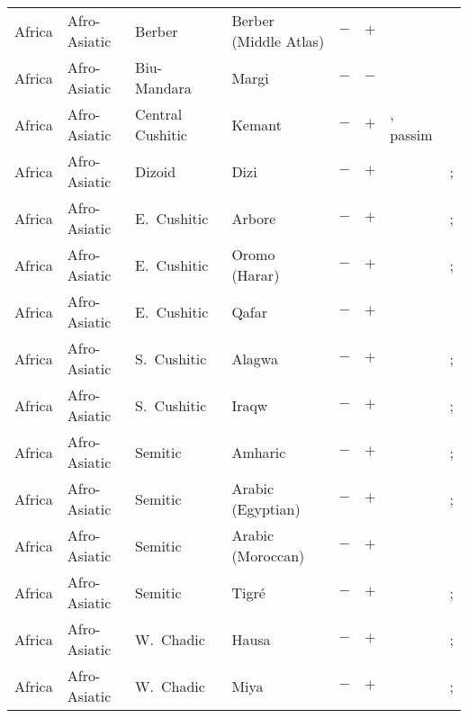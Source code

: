 \begin{landscape}
\begin{longtable}{l>{\raggedright\arraybackslash}p{2.2cm}>{\raggedright}p{2.5cm}>{\raggedright\arraybackslash}p{2.5cm}cc>{\raggedright\arraybackslash}p{3.4cm}>{\raggedright\arraybackslash}p{3.4cm}}
Africa & Afro-Asiatic & Berber & Berber (Middle Atlas) & $-$ & $+$ & \citealt[24--25]{Penchoen1973} & \citealt[12--13, 21--22, 25--27, 39--40, 54--55]{Penchoen1973}\\
Africa & Afro-Asiatic & Biu-Mandara & Margi & $-$ & $-$ & \citealt{Gil2013} & \citealt[46, 72--75, 85--87]{Hoffman1963}\\
Africa & Afro-Asiatic & Central Cushitic & Kemant & $-$ & $+$ & \citealt[329]{Appleyard1975}, passim & \citealt[319--322, 332--333]{Appleyard1975}\\
Africa & Afro-Asiatic & Dizoid & Dizi & $-$ & $+$ & \citealt{Gil2013} & \citealt{Corbett2013}; \citealt[295]{Nichols1992}\\
Africa & Afro-Asiatic & E.~Cushitic & Arbore & $-$ & $+$ & \citealt{Gil2013} & \citealt{Corbett2013}; \citealt[131--132]{Hayward1984}\\
Africa & Afro-Asiatic & E.~Cushitic & Oromo (Harar) & $-$ & $+$ & \citealt{Gil2013} & \citealt{Corbett2013}; \citealt[65]{Owens1985}\\
Africa & Afro-Asiatic & E.~Cushitic & Qafar & $-$ & $+$ & \citealt[185--186]{Bliese1981} & \citealt[180--182, 186--188]{Bliese1981}\\
Africa & Afro-Asiatic & S.~Cushitic & Alagwa & $-$ & $+$ & \citealt{Gil2013} & \citealt{Corbett2013}; \citealt[147--149]{Mous2008}\\
Africa & Afro-Asiatic & S.~Cushitic & Iraqw & $-$ & $+$ & \citealt{Gil2013} & \citealt{Corbett2013}; \citealt[41]{Mous1992}\\
Africa & Afro-Asiatic & Semitic & Amharic & $-$ & $+$ & \citealt{Gil2013} & \citealt{Corbett2013}; \citealt[33--34]{Leslau1995}\\
Africa & Afro-Asiatic & Semitic & Arabic (Egyptian) & $-$ & $+$ & \citealt{Gil2013} & \citealt{Corbett2013}; \citealt[12--18]{Hanna1967}\\
Africa & Afro-Asiatic & Semitic & Arabic (Moroccan) & $-$ & $+$ & \citealt{Gil2013} & \citealt[40, 45--46, 95--97]{Harrell1962}\\
Africa & Afro-Asiatic & Semitic & Tigré & $-$ & $+$ & \citealt[110--112]{Elias2005}& \citealt{Corbett2013}; \citealt[210--216]{Elias2005}\\
Africa & Afro-Asiatic & W.~Chadic & Hausa & $-$ & $+$ & \citealt{Gil2013} & \citealt{Corbett2013}; \citealt[47]{Schuh1976}\\
Africa & Afro-Asiatic & W.~Chadic & Miya & $-$ & $+$ & \citealt{Gil2013} & \citealt{Corbett2013}; \citealt[171--173]{Schuh1989}\\

\end{longtable}
\end{landscape}
